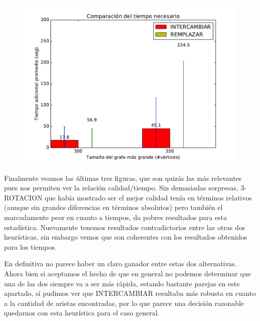\begin{figure}[H]
\begin{minipage}{0.49\textwidth}
  \centering
    \includegraphics[width=1\textwidth]{graficos/problema_5/tiempo4.pdf}
  \caption{}
  \label{fig:5-tiempo3}
\end{minipage}%
\end{figure}

Finalmente veamos las últimas tres figuras, que son quizás las más relevantes pues nos permiten ver la relación calidad/tiempo. Sin demasiadas sorpresas, 3-ROTACION que había mostrado ser el mejor calidad tenía en términos relativos (aunque sin grandes diferencias en términos absolutos) pero también el marcadamente peor en cuanto a tiempos, da pobres resultados para esta estadística. Nuevamente tenemos resultados contradictorios entre las otras dos heurísticas, sin embargo vemos que son coherentes con los resultados obtenidos para los tiempos. 

En definitiva no parece haber un claro ganador entre estas dos alternativas. Ahora bien si aceptamos el hecho de que en general no podemos determinar que una de las dos siempre va a ser más rápida, estando bastante parejas en este apartado, sí pudimos ver que INTERCAMBIAR resultaba más robusta en cuanto a la cantidad de aristas encontradas, por lo que parece una decisión razonable quedarnos con esta heurística para el caso general. 

